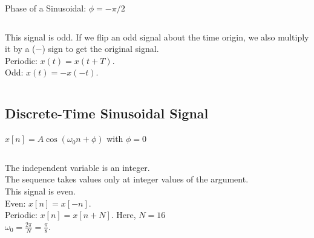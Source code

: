 \begin{frame}[plain]{Phase of a Sinusoidal: $\phi = -\pi/2$}
    {
        \begin{columns}[t]
            {
                \centering
                
            }
            {
                \noindent This signal is \alert{odd}. If we flip an odd signal about the time origin, we also multiply it by a ($-$) sign to get the original signal.\\[12pt]
                Periodic: $x(t) = x(t+ T)$.\\
                Odd: $x(t) = -x(-t)$.
            }
        \end{columns}
    }
\end{frame}

\subsection{Discrete-Time Sinusoidal Signal}

\begin{frame}[plain]{$x[n] = A\cos(\omega_0n+\phi)$ with $\phi = 0$}
    {
        \begin{columns}[t]
            {
                \centering
                
            }
            {
                \noindent The independent variable is an integer.\\
                The sequence takes values only at integer values of the argument.\\
                This signal is \alert{even}. \\[12pt]
                Even: $x[n] = x[-n]$.\\
                Periodic: $x[n] = x[n+N]$. Here, $N=16$\\
                $\omega_0 = \frac{2\pi}{N} = \frac{\pi}{8}$.


            }
        \end{columns}
    }
\end{frame}


